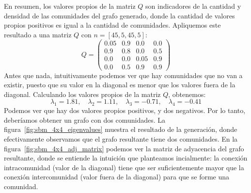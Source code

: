 \documentclass{article}
\begin{document}
En resumen, los valores propios de la matriz $Q$ son indicadores de la cantidad y densidad de las comunidades del grafo generado, donde la cantidad de valores
propios positivos es igual a la cantidad de comunidades. Apliquemos este resultado a una matriz $Q$ con $n=[45, 5, 45, 5]$:
\begin{equation}
    \label{eq:sbm_4x4_matrix}
    Q = \begin{pmatrix}
        0.05 & 0.9 & 0.0 & 0.0 \\
        0.9 & 0.8 & 0.0 & 0.5 \\
        0.0 & 0.0 & 0.05 & 0.9 \\
        0.0 & 0.5 & 0.9 & 0.9
    \end{pmatrix}
\end{equation}
Antes que nada, intuitivamente podemos ver que hay comunidades que no van a existir, puesto que su valor en la diagonal es menor que los valores
fuera de la diagonal. Calculando los valores propios de la matriz $Q$, obtenemos:
\begin{equation}
    \label{eq:sbm_4x4_eigenvalues}
    \lambda_1 = 1.81, \quad\lambda_2 = 1.11, \quad\lambda_3 = -0.71, \quad\lambda_4 = -0.41
\end{equation}
Podemos ver que hay dos valores propios positivos, y dos negativos. Por lo tanto, deberíamos obtener un grafo con dos comunidades. 
La figura~\ref{fig:sbm_4x4_eigenvalues} muestra el resultado de la generación, donde efectivamente observamos que el grafo resultante
tiene dos comunidades. En la figura~\ref{fig:sbm_4x4_adj_matrix} podemos ver la matriz de adyacencia del grafo resultante, donde se entiende
la intuición que planteamos incialmente: la conexión intracomunidad (valor de la diagonal) tiene que ser suficientemente mayor que la conexión intercomunidad (valor fuera de la diagonal) para que se forme una comunidad.
\end{document}
